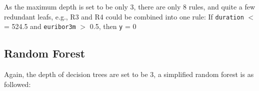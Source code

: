 \documentclass[11pt,a4paper]{article}
\begin{document}
    As the maximum depth is set to be only 3, there are only 8 rules, and quite a few redundant leafs, e.g., R3 and R4 could be combined into one rule: If \texttt{duration} $<$= 524.5 and \texttt{euribor3m} $>$ 0.5, then \texttt{y} = 0
    
    \newpage
    \subsection{Random Forest} \label{random_forest}
    Again, the depth of decision trees are set to be 3, a simplified random forest is as followed:
    

\end{document}

